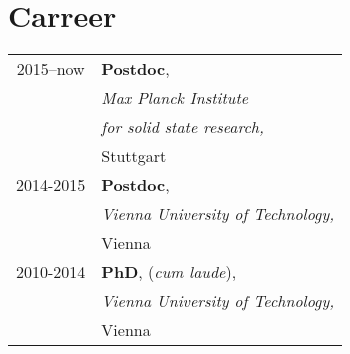 \documentclass[11pt,sans]{moderncv} %
\begin{document}
\thispagestyle{empty}
\makecvtitle %






\section{Carreer}
\begin{minipage}{0.35\textwidth}
\begin{tabular}{@{\hskip 0.2 cm} c@{\hskip 0.75cm} l}
2015--now & \textbf{Postdoc}, \\ & \textit{Max Planck Institute} \\ 
& \textit{for solid state research,} \\ 
& Stuttgart \vspace{0.5cm} \\	


2014-2015 & \textbf{Postdoc}, \\
          & \textit{Vienna University of Technology,} \\ 
          & Vienna\vspace{0.5cm} \\
          
2010-2014 & \textbf{PhD}, (\textit{cum laude}), \\
	  & \textit{Vienna University of Technology,} \\ 
          & Vienna \\

\end{tabular}
 
\end{minipage}
\end{document}
